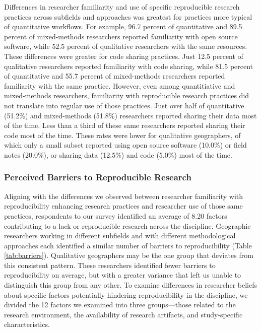 \documentclass[]{interact}
\theoremstyle{plain}%
\theoremstyle{definition}
\theoremstyle{remark}
\begin{document}
Differences in researcher familiarity and use of specific reproducible research practices across subfields and approaches was greatest for practices more typical of quantitative workflows. 
For example, 96.7 percent of quantitative and 89.5 percent of mixed-methods researchers reported familiarity with open source software, while 52.5 percent of qualitative researchers with the same resources.
These differences were greater for code sharing practices. 
Just 12.5 percent of qualitative researchers reported familiarity with code sharing, while 81.5 percent of quantitative and 55.7 percent of mixed-methods researchers reported familiarity with the same practice.
However, even among quantitiative and mixed-methods researchers, familiarity with reproducible research practices did not translate into regular use of those practices.
Just over half of quantitative (51.2\%) and mixed-methods (51.8\%) researchers reported sharing their data most of the time.
Less than a third of these same researchers reported sharing their code most of the time. 
These rates were lower for qualitative geographers, of which only a small subset reported using open source software (10.0\%) or field notes (20.0\%), or sharing data (12.5\%) and code (5.0\%) most of the time.

\subsubsection*{Perceived Barriers to Reproducible Research}
Aligning with the differences we observed between researcher familiarity with reproducibility enhancing research practices and researcher use of those same practices, respondents to our survey identified an average of 8.20 factors contributing to a lack or reproducible research across the discipline. 
Geographic researchers working in different subfields and with different methodological approaches each identified a similar number of barriers to reproducibility (Table \ref{tab:barriers}).
Qualitative geographers may be the one group that deviates from this consistent pattern. 
These researchers identified fewer barriers to reproducibility on average, but with a greater variance that left us unable to distinguish this group from any other.
To examine differences in researcher beliefs about specific factors potentially hindering reproducibility in the discipline, we divided the 12 factors we examined into three groups---those related to the research environment, the availability of research artifacts, and study-specific characteristics. 
\end{document}
